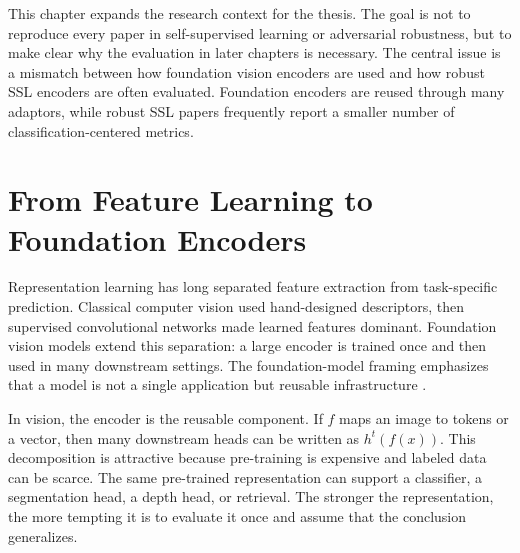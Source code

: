 

























This chapter expands the research context for the thesis. The goal is not to reproduce every paper in self-supervised learning or adversarial robustness, but to make clear why the evaluation in later chapters is necessary. The central issue is a mismatch between how foundation vision encoders are used and how robust SSL encoders are often evaluated. Foundation encoders are reused through many adaptors, while robust SSL papers frequently report a smaller number of classification-centered metrics.

\section{From Feature Learning to Foundation Encoders}

Representation learning has long separated feature extraction from task-specific prediction. Classical computer vision used hand-designed descriptors, then supervised convolutional networks made learned features dominant. Foundation vision models extend this separation: a large encoder is trained once and then used in many downstream settings. The foundation-model framing emphasizes that a model is not a single application but reusable infrastructure \parencite{bommasani2021opportunities}.

In vision, the encoder is the reusable component. If $f$ maps an image to tokens or a vector, then many downstream heads can be written as $h^t(f(x))$. This decomposition is attractive because pre-training is expensive and labeled data can be scarce. The same pre-trained representation can support a classifier, a segmentation head, a depth head, or retrieval. The stronger the representation, the more tempting it is to evaluate it once and assume that the conclusion generalizes.

